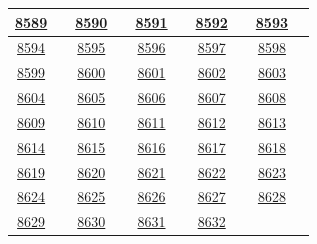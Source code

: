 \documentclass[11pt,a4paper]{article}
\newcommand{\en}[1]{\textenglish{#1}}
\begin{document}
{\begin{longtable}{|c|c||c|c||c|c||c|c||c|c|}
\hyperref[q8589]{\en{8589}} & \pageref{q8589} & \hyperref[q8590]{\en{8590}} & \pageref{q8590} & \hyperref[q8591]{\en{8591}} & \pageref{q8591} & \hyperref[q8592]{\en{8592}} & \pageref{q8592} & \hyperref[q8593]{\en{8593}} & \pageref{q8593}\\\hline
\hyperref[q8594]{\en{8594}} & \pageref{q8594} & \hyperref[q8595]{\en{8595}} & \pageref{q8595} & \hyperref[q8596]{\en{8596}} & \pageref{q8596} & \hyperref[q8597]{\en{8597}} & \pageref{q8597} & \hyperref[q8598]{\en{8598}} & \pageref{q8598}\\\hline
\hyperref[q8599]{\en{8599}} & \pageref{q8599} & \hyperref[q8600]{\en{8600}} & \pageref{q8600} & \hyperref[q8601]{\en{8601}} & \pageref{q8601} & \hyperref[q8602]{\en{8602}} & \pageref{q8602} & \hyperref[q8603]{\en{8603}} & \pageref{q8603}\\\hline
\hyperref[q8604]{\en{8604}} & \pageref{q8604} & \hyperref[q8605]{\en{8605}} & \pageref{q8605} & \hyperref[q8606]{\en{8606}} & \pageref{q8606} & \hyperref[q8607]{\en{8607}} & \pageref{q8607} & \hyperref[q8608]{\en{8608}} & \pageref{q8608}\\\hline
\hyperref[q8609]{\en{8609}} & \pageref{q8609} & \hyperref[q8610]{\en{8610}} & \pageref{q8610} & \hyperref[q8611]{\en{8611}} & \pageref{q8611} & \hyperref[q8612]{\en{8612}} & \pageref{q8612} & \hyperref[q8613]{\en{8613}} & \pageref{q8613}\\\hline
\hyperref[q8614]{\en{8614}} & \pageref{q8614} & \hyperref[q8615]{\en{8615}} & \pageref{q8615} & \hyperref[q8616]{\en{8616}} & \pageref{q8616} & \hyperref[q8617]{\en{8617}} & \pageref{q8617} & \hyperref[q8618]{\en{8618}} & \pageref{q8618}\\\hline
\hyperref[q8619]{\en{8619}} & \pageref{q8619} & \hyperref[q8620]{\en{8620}} & \pageref{q8620} & \hyperref[q8621]{\en{8621}} & \pageref{q8621} & \hyperref[q8622]{\en{8622}} & \pageref{q8622} & \hyperref[q8623]{\en{8623}} & \pageref{q8623}\\\hline
\hyperref[q8624]{\en{8624}} & \pageref{q8624} & \hyperref[q8625]{\en{8625}} & \pageref{q8625} & \hyperref[q8626]{\en{8626}} & \pageref{q8626} & \hyperref[q8627]{\en{8627}} & \pageref{q8627} & \hyperref[q8628]{\en{8628}} & \pageref{q8628}\\\hline
\hyperref[q8629]{\en{8629}} & \pageref{q8629} & \hyperref[q8630]{\en{8630}} & \pageref{q8630} & \hyperref[q8631]{\en{8631}} & \pageref{q8631} & \hyperref[q8632]{\en{8632}} & \pageref{q8632} &  & \\\hline
\end{longtable}
}
\end{document}
